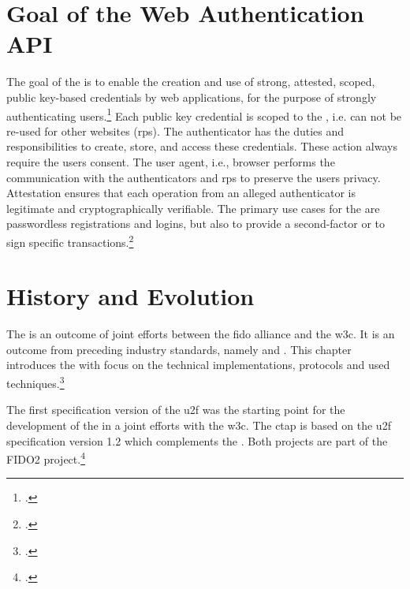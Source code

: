 \section{Goal of the Web Authentication API}

The goal of the \wa{} is to enable \frqq the creation and use of strong, attested, scoped, public key-based credentials by web applications, for the purpose of strongly authenticating users\flqq.\footcites[See][Abstract]{w3c} Each public key credential is scoped to the , i.e. can not be re-used for other websites (\glspl{rp}). The authenticator has the duties and responsibilities to create, store, and access these credentials. These action always require the users consent. The user agent, i.e., browser performs the communication with the authenticators and \glspl{rp} to preserve the users privacy. Attestation ensures that each operation from an alleged authenticator is legitimate and cryptographically verifiable. The primary use cases for the \wa{} are passwordless registrations and logins, but also to provide a second-factor or to sign specific transactions.\footcites[See][Abstract, Chapter 1.2]{w3c}

\section{History and Evolution}

The \wa{} is an outcome of joint efforts between	 the \gls{fido} alliance and the \gls{w3c}. It is an outcome from preceding industry standards, namely  and . This chapter introduces the \wa{} with focus on the technical implementations, protocols and used techniques.\footcites[See][24]{fido-ct-3}

The first specification version of the \gls{u2f} was the starting point for the development of the \wa{} in a joint efforts with the \gls{w3c}. The \gls{ctap} is based on the \gls{u2f} specification version 1.2 which complements the \wa. Both projects are part of the FIDO2 project.\footcite[See][169--170]{grimes2017hacking}
